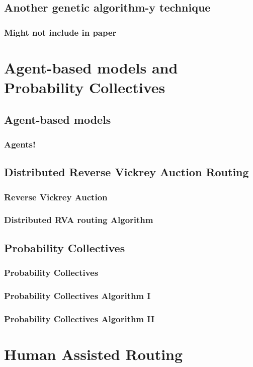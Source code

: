 \documentclass{beamer}
\begin{document}
\subsection{Another genetic algorithm-y technique}

\begin{frame}
\frametitle{Might not include in paper}
\end{frame}


\section{Agent-based models and Probability Collectives}

\subsection{Agent-based models}

\begin{frame}
\frametitle{Agents!}
\end{frame}

\subsection{Distributed Reverse Vickrey Auction Routing}

\begin{frame}
\frametitle{Reverse Vickrey Auction}
\end{frame}

\begin{frame}
\frametitle{Distributed RVA routing Algorithm}
\end{frame}

\subsection{Probability Collectives}

\begin{frame}
\frametitle{Probability Collectives}
\end{frame}


\begin{frame}
\frametitle{Probability Collectives Algorithm I}
\end{frame}

\begin{frame}
\frametitle{Probability Collectives Algorithm II}
\end{frame}

\section{Human Assisted Routing}
\end{document}
